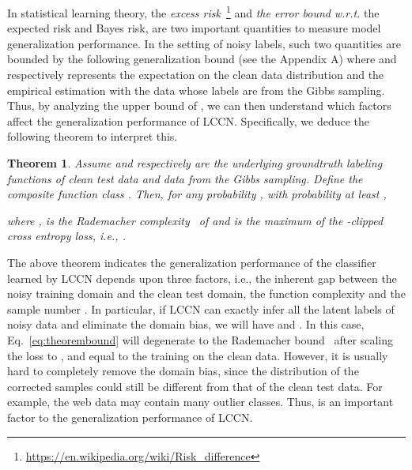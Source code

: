 \documentclass[journal]{IEEEtran}
\newtheorem{theorem}{Theorem}
\begin{document}
In statistical learning theory, the \emph{excess risk}~\footnote{\url{https://en.wikipedia.org/wiki/Risk_difference}} and \emph{the error bound} \textit{w.r.t.} the expected risk and Bayes risk, are two important quantities to measure model generalization performance. In the setting of noisy labels, such two quantities are bounded by the following generalization bound (see the Appendix A)  where  and  respectively represents the expectation on the clean data distribution and the empirical estimation with the data whose labels are from the Gibbs sampling. Thus, by analyzing the upper bound of , we can then understand which factors affect the generalization performance of LCCN. Specifically, we deduce the following theorem to interpret this.
\begin{theorem} \label{theorem}
Assume  and  respectively are the underlying groundtruth labeling functions  of clean test data and data from the Gibbs sampling. Define the composite function class . Then, for any probability , with probability at least ,

where ,  is the Rademacher complexity~\cite{bartlett2002rademacher} of  and  is the maximum of the -clipped cross entropy loss, i.e., .
\end{theorem}
The above theorem indicates the generalization performance of the classifier learned by LCCN depends upon three factors, i.e., the inherent gap  between the noisy training domain and the clean test domain, the function complexity  and the sample number . In particular, if LCCN can exactly infer all the latent labels of noisy data and eliminate the domain bias, we will have  and . In this case, Eq.~\eqref{eq:theorembound} will degenerate to the Rademacher bound~\cite{mansour2009domain} after scaling the loss to , and equal to the training on the clean data. However, it is usually hard to completely remove the domain bias, since the distribution of the corrected samples could still be different from that of the clean test data. For example, the web data may contain many outlier classes. Thus,  is an important factor to the generalization performance of LCCN.
\end{document}
